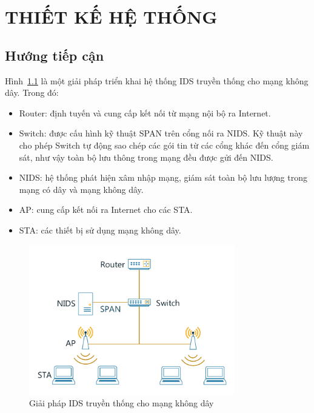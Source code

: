 \chapter{THIẾT KẾ HỆ THỐNG}
\ifpdf
    \graphicspath{{Chapter3/Chapter3Figs/PNG/}{Chapter3/Chapter3Figs/PDF/}{Chapter3/Chapter3Figs/}}
\else
    \graphicspath{{Chapter3/Chapter3Figs/EPS/}{Chapter3/Chapter3Figs/}}
\fi

\section{Hướng tiếp cận}
Hình~\ref{fig:wids-traditional} là một giải pháp triển khai hệ thống IDS truyền thống cho mạng không dây. Trong đó:

\begin{itemize}
\item Router: định tuyến và cung cấp kết nối từ mạng nội bộ ra Internet.
\item Switch: được cấu hình kỹ thuật SPAN trên cổng nối ra NIDS. Kỹ thuật này cho phép Switch tự động sao chép các gói tin từ các cổng khác đến cổng giám sát, như vậy toàn bộ lưu thông trong mạng đều được gửi đến NIDS.
\item NIDS: hệ thống phát hiện xâm nhập mạng, giám sát toàn bộ lưu lượng trong mạng có dây và mạng không dây.
\item AP: cung cấp kết nối ra Internet cho các STA.
\item STA: các thiết bị sử dụng mạng không dây.
\end{itemize}

\begin{figure}[H]
    \centering
    \includegraphics[width=0.8\textwidth]{wids-traditional}
    \caption{
        \label{fig:wids-traditional}
        Giải pháp IDS truyền thống cho mạng không dây}
\end{figure}

